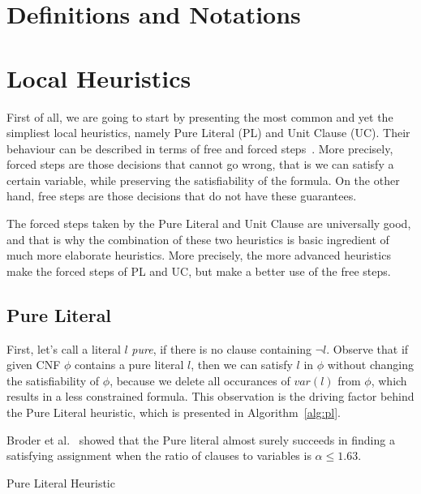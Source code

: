 \documentclass[10pt]{article}
\begin{document}
\section{Definitions and Notations}

\section{Local Heuristics}
\par
First of all, we are going to start by presenting the most common and 
yet the simpliest local heuristics, namely Pure Literal (PL) and Unit Clause (UC). 
Their behaviour can be described in terms of free and forced steps~\cite{satdiffeq}.
More precisely, forced steps are those decisions that cannot go wrong, that is we can satisfy a certain variable, while preserving the satisfiability of the formula.
On the other hand, free steps are those decisions that do not have these guarantees.

\par
The forced steps taken by the Pure Literal and Unit Clause are universally good, and that is why the combination of these two heuristics is basic ingredient of much more elaborate heuristics. More precisely, the more advanced heuristics make the forced steps of PL and UC, but make a better use of the free steps.


\subsection{Pure Literal}
\par
First, let's call a literal $l$ \textit{pure}, if there is no clause containing $\neg l$. Observe that if given CNF $\phi$ contains a pure literal $l$, then we can satisfy $l$ in $\phi$ without changing the satisfiability of $\phi$, because we delete all occurances of $var(l)$ from $\phi$, which results in a less constrained formula.
This observation is the driving factor behind the Pure Literal heuristic, which is presented in Algorithm~\ref{alg:pl}. 
\par
Broder et al.~\cite{pureliteral} showed that the Pure literal almost surely succeeds in finding a satisfying assignment when the ratio of clauses to variables is $\alpha \le 1.63$. 
\begin{algorithm}
\caption{Pure Literal Heuristic}\label{alg:pl}


\end{algorithm}
\end{document}
